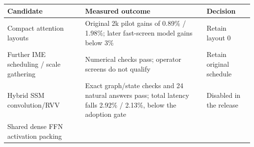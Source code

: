 \documentclass[10pt,a4paper]{article}
\begin{document}
\begin{longtable}[]{@{}lll@{}}
\toprule
\begin{minipage}[b]{0.30\columnwidth}\raggedright
Candidate\strut
\end{minipage} & \begin{minipage}[b]{0.30\columnwidth}\raggedright
Measured outcome\strut
\end{minipage} & \begin{minipage}[b]{0.30\columnwidth}\raggedright
Decision\strut
\end{minipage}\tabularnewline
\midrule
\endhead
\begin{minipage}[t]{0.30\columnwidth}\raggedright
Compact attention layouts\strut
\end{minipage} & \begin{minipage}[t]{0.30\columnwidth}\raggedright
Original 2k pilot gains of 0.89\% / 1.98\%; later fast-screen model
gains below 3\%\strut
\end{minipage} & \begin{minipage}[t]{0.30\columnwidth}\raggedright
Retain layout 0\strut
\end{minipage}\tabularnewline
\begin{minipage}[t]{0.30\columnwidth}\raggedright
Further IME scheduling / scale gathering\strut
\end{minipage} & \begin{minipage}[t]{0.30\columnwidth}\raggedright
Numerical checks pass; operator screens do not qualify\strut
\end{minipage} & \begin{minipage}[t]{0.30\columnwidth}\raggedright
Retain original schedule\strut
\end{minipage}\tabularnewline
\begin{minipage}[t]{0.30\columnwidth}\raggedright
Hybrid SSM convolution/RVV\strut
\end{minipage} & \begin{minipage}[t]{0.30\columnwidth}\raggedright
Exact graph/state checks and 24 natural answers pass; total latency
falls 2.92\% / 2.13\%, below the adoption gate\strut
\end{minipage} & \begin{minipage}[t]{0.30\columnwidth}\raggedright
Disabled in the release\strut
\end{minipage}\tabularnewline
\begin{minipage}[t]{0.30\columnwidth}\raggedright
Shared dense FFN activation packing\strut
\end{minipage} & \begin{minipage}[t]{0.30\columnwidth}\raggedright

\end{minipage}
\end{longtable}
\end{document}
